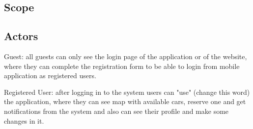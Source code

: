 \documentclass{article}
\begin{document}
		\subsection{Scope}
		
		\subsection{Actors}
			\item Guest: all guests can only see the login page of the application or of the website, where they can complete the registration form to be able to login from mobile application as registered users.
			
			\item Registered User: after logging in to the system users can "use" (change this word) the application, where they can see map with available cars, reserve one and get notifications from the system and also can see their profile and make some changes in it.     	
\end{document}
